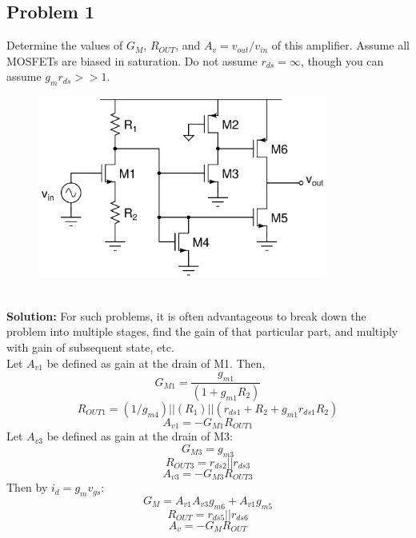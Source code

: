 \documentclass{article}
\begin{document}
\subsection*{Problem 1}
Determine the values of $G_M$, $R_{OUT}$, and $A_v = v_{out}/v_{in}$ of this amplifier.  Assume all MOSFETs are biased in saturation.  Do not assume $r_{ds} = \infty$, though you can assume $g_mr_{ds} >> 1$.
\begin{figure}[!h]
\begin{center}
    \includegraphics[width=0.85\textwidth]{figures/cc_amp1.png}
\end{center}
\end{figure} \\
\textbf{Solution: }
For such problems, it is often advantageous to break down the problem into multiple stages, find the gain of that particular part, and multiply with gain of subsequent state, etc. \\
Let $A_{v1}$ be defined as gain at the drain of M1. Then,   
$$G_{M1} = \frac{g_{m1}}{(1+g_{m1}R_2)}$$ 
$$R_{OUT1} = (1/g_{m4})  ||  (R_1) || (r_{ds1} + R_2 + g_{m1}r_{ds1}R_2)$$
$$A_{v1} = -G_{M1}R_{OUT1}$$
$$$$
Let $A_{v3}$ be defined as gain at the drain of M3: 
$$G_{M3} = g_{m3}$$
$$R_{OUT3} = r_{ds2}  ||  r_{ds3} $$
$$A_{v3} = -G_{M3}R_{OUT3}$$
Then by ${i_d = g_m  v_{gs}}$:
$$G_M = A_{v1}A_{v3}g_{m6} + A_{v1}g_{m5}$$
$$R_{OUT} = r_{ds5} || r_{ds6}$$
$$A_v = -G_{M}R_{OUT}$$
\newpage
\end{document}

